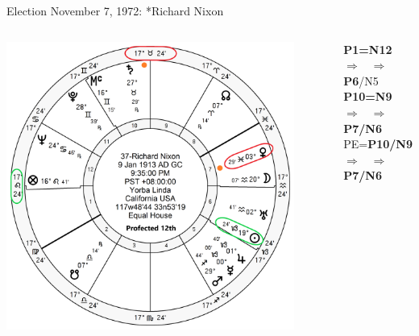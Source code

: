 \begin{frame}[t]{Election November 7, 1972: *Richard Nixon}
\begin{columns}[T, onlytextwidth]
\vspace{-1em}
{\includegraphics[width=0.9\textwidth]{charts/Nixon-Prof-12th.png}}
\fontsize{8pt}{9pt}\selectfont

\textbf{\dgreen P1=N12} 
	$\Rightarrow$ \Sun\, $\Rightarrow$ \textbf{\dgreen P6}/N5\\
\textbf{\red P10=N9}
	$\Rightarrow$ \Venus\, $\Rightarrow$ \textbf{\dgreen P7/N6}\\
PE=\textbf{\red P10/N9}
	 $\Rightarrow$ \Venus\, $\Rightarrow$ \textbf{\dgreen P7/N6}


\end{columns}
\end{frame}

